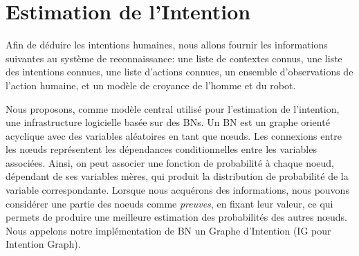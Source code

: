 \documentclass[a4paper,11pt,twoside]{StyleThese}
\begin{document}


\section{Estimation de l'Intention}

Afin de déduire les intentions humaines, nous allons fournir les informations suivantes au système de reconnaissance: une liste de contextes connus, une liste des intentions connues, une liste d'actions connues, un ensemble d'observations de l'action humaine, et un modèle de croyance de l'homme et du robot.

Nous proposons, comme modèle central utilisé pour l'estimation de l'intention, une infrastructure logicielle basée sur des BNs. Un BN est un graphe orienté acyclique avec des variables aléatoires en tant que nœuds. Les connexions entre les nœuds représentent les dépendances conditionnelles entre les variables associées. Ainsi, on peut associer une fonction de probabilité à chaque noeud, dépendant de ses variables mères, qui produit la distribution de probabilité de la variable correspondante. Lorsque nous acquérons des informations, nous pouvons considérer une partie des noeuds comme \textit{preuves}, en fixant leur valeur, ce qui permets de produire une meilleure estimation des probabilités des autres nœuds. Nous appelons notre implémentation de BN un Graphe d'Intention (IG pour Intention Graph).

\end{document}
